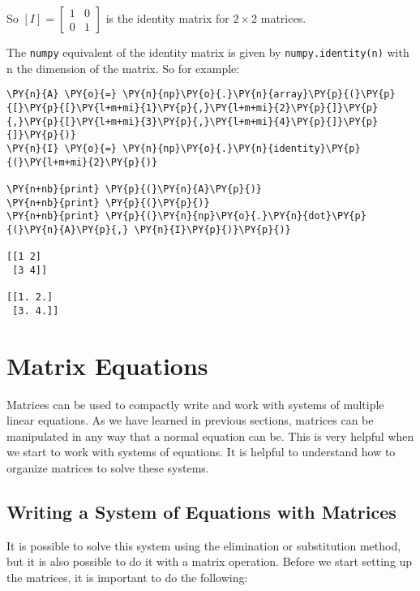 So \([I] = 
\begin{bmatrix}
1 & 0 \\
0 & 1
\end{bmatrix}
\) is the identity matrix for \(2\times 2\) matrices.

The \texttt{numpy} equivalent of the identity matrix is given by
\texttt{numpy.identity(n)} with n the dimension of the matrix. So for
example:

    \begin{tcolorbox}[breakable, size=fbox, boxrule=1pt, pad at break*=1mm,colback=cellbackground, colframe=cellborder]
\begin{Verbatim}[commandchars=\\\{\}]
\PY{n}{A} \PY{o}{=} \PY{n}{np}\PY{o}{.}\PY{n}{array}\PY{p}{(}\PY{p}{[}\PY{p}{[}\PY{l+m+mi}{1}\PY{p}{,}\PY{l+m+mi}{2}\PY{p}{]}\PY{p}{,}\PY{p}{[}\PY{l+m+mi}{3}\PY{p}{,}\PY{l+m+mi}{4}\PY{p}{]}\PY{p}{]}\PY{p}{)}
\PY{n}{I} \PY{o}{=} \PY{n}{np}\PY{o}{.}\PY{n}{identity}\PY{p}{(}\PY{l+m+mi}{2}\PY{p}{)}

\PY{n+nb}{print} \PY{p}{(}\PY{n}{A}\PY{p}{)}
\PY{n+nb}{print} \PY{p}{(}\PY{p}{)}
\PY{n+nb}{print} \PY{p}{(}\PY{n}{np}\PY{o}{.}\PY{n}{dot}\PY{p}{(}\PY{n}{A}\PY{p}{,} \PY{n}{I}\PY{p}{)}\PY{p}{)}

[[1 2]
 [3 4]]

[[1. 2.]
 [3. 4.]]
    \end{Verbatim}
\end{tcolorbox}

\section{Matrix Equations}\label{matrix-equations}

Matrices can be used to compactly write and work with systems of
multiple linear equations. As we have learned in previous sections,
matrices can be manipulated in any way that a normal equation can be.
This is very helpful when we start to work with systems of equations. It
is helpful to understand how to organize matrices to solve these
systems.

\subsection{Writing a System of Equations with Matrices}\label{writing-a-system-of-equations-with-matrices}

It is possible to solve this system using the elimination or
substitution method, but it is also possible to do it with a matrix
operation. Before we start setting up the matrices, it is important to
do the following:


